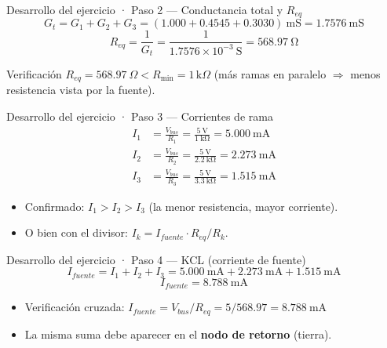 \documentclass[aspectratio=169]{beamer}
\begin{document}
\begin{frame}{Desarrollo del ejercicio · Paso 2 — Conductancia total y $R_{eq}$}
  \[
    G_t = G_1 + G_2 + G_3 = (1.000 + 0.4545 + 0.3030)\ \text{mS}
        = \SI{1.7576}{\milli\siemens}
  \]
  \[
    R_{eq} = \frac{1}{G_t} = \frac{1}{1.7576\times 10^{-3}\ \text{S}}
    = \SI{568.97}{\ohm}
  \]
  \pause
  \begin{block}{Verificación}
    $R_{eq} = 568.97\ \Omega < R_{\min} = 1\,\text{k}\Omega$ \checkmark
    (más ramas en paralelo $\Rightarrow$ menos resistencia vista por la fuente).
  \end{block}
\end{frame}

\begin{frame}{Desarrollo del ejercicio · Paso 3 — Corrientes de rama}
  \begin{align*}
    I_1 &= \frac{V_{bus}}{R_1} = \frac{\SI{5}{\volt}}{\SI{1}{\kilo\ohm}}
           = \SI{5.000}{\milli\ampere}\\[2pt]
    I_2 &= \frac{V_{bus}}{R_2} = \frac{\SI{5}{\volt}}{\SI{2.2}{\kilo\ohm}}
           = \SI{2.273}{\milli\ampere}\\[2pt]
    I_3 &= \frac{V_{bus}}{R_3} = \frac{\SI{5}{\volt}}{\SI{3.3}{\kilo\ohm}}
           = \SI{1.515}{\milli\ampere}
  \end{align*}
  \pause
  \begin{itemize}
    \item Confirmado: $I_1 > I_2 > I_3$ (la menor resistencia, mayor corriente).
    \item O bien con el divisor: $I_k = I_{fuente}\cdot R_{eq}/R_k$.
  \end{itemize}
\end{frame}

\begin{frame}{Desarrollo del ejercicio · Paso 4 — KCL (corriente de fuente)}
  \[
    I_{fuente} = I_1 + I_2 + I_3
    = \SI{5.000}{\milli\ampere} + \SI{2.273}{\milli\ampere} + \SI{1.515}{\milli\ampere}
  \]
  \[
    \boxed{\;I_{fuente} = \SI{8.788}{\milli\ampere}\;}
  \]
  \pause
  \begin{itemize}
    \item Verificación cruzada: $I_{fuente} = V_{bus}/R_{eq} = 5/568.97 =
      \SI{8.788}{\milli\ampere}$ \checkmark
    \item La misma suma debe aparecer en el \textbf{nodo de retorno} (tierra).
  \end{itemize}
\end{frame}
\end{document}
